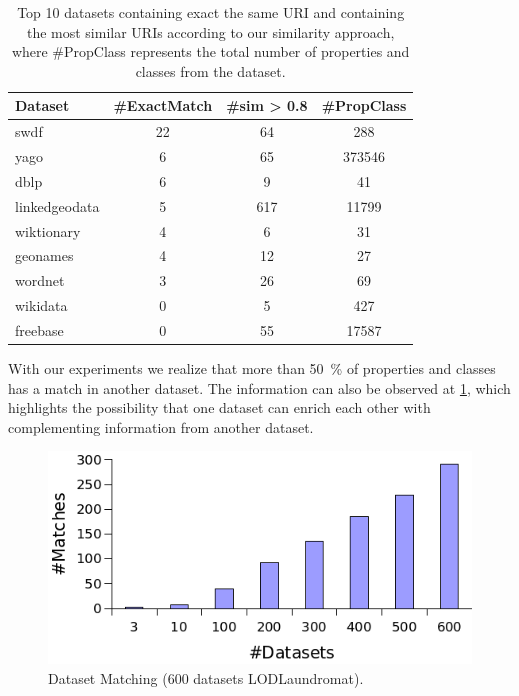\documentclass[sw]{iosart2x}
\begin{document}
\begin{table}[htb]
\centering
\begin{tabular}{lS[table-format=9.0]S[table-format=8.0]S[table-format=10.0]}
\toprule
\textbf{Dataset} & \textbf{\#ExactMatch} & \textbf{\#sim > 0.8} & \textbf{\#PropClass} \\
\midrule
swdf & 22 & 64 & 288 \\
yago & 6 & 65 & 373546 \\
dblp & 6 & 9 & 41 \\
linkedgeodata & 5 & 617 & 11799 \\
wiktionary & 4 & 6 & 31 \\
geonames & 4 & 12 & 27 \\
wordnet & 3 & 26 & 69 \\
wikidata & 0 & 5 & 427 \\
freebase & 0 & 55 & 17587 \\
\bottomrule
\end{tabular}
\caption{Top 10 datasets containing exact the same URI and containing the most similar URIs according to our similarity approach, where \#PropClass represents the total number of properties and classes from the dataset. }
\label{tab:top10}
\end{table}



With our experiments we realize that more than \SI{50}{\percent} of properties and classes has a match in another dataset.
The information can also be observed at \cref{fig:match600Laundromat}, which highlights the possibility that one dataset can enrich each other with complementing information from another dataset.


\begin{figure}[htb] 
	\centering
	\includegraphics[width=\linewidth]{img/LaundromatDsMatch.png}
	\caption{Dataset Matching (600 datasets LODLaundromat).}
	\label{fig:match600Laundromat}
\end{figure}
\end{document}
